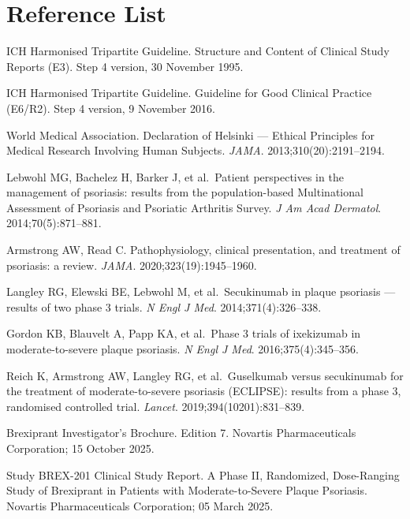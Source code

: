 \documentclass[11pt, a4paper]{article}
\begin{document}
\newpage

\section{Reference List}

\begin{enumerate}[label={[\arabic*]}, leftmargin=*]
  \item ICH Harmonised Tripartite Guideline. Structure and Content of Clinical Study Reports (E3). Step 4 version, 30 November 1995.
  \item ICH Harmonised Tripartite Guideline. Guideline for Good Clinical Practice (E6/R2). Step 4 version, 9 November 2016.
  \item World Medical Association. Declaration of Helsinki --- Ethical Principles for Medical Research Involving Human Subjects. \textit{JAMA}. 2013;310(20):2191--2194.
  \item Lebwohl MG, Bachelez H, Barker J, et al.\ Patient perspectives in the management of psoriasis: results from the population-based Multinational Assessment of Psoriasis and Psoriatic Arthritis Survey. \textit{J Am Acad Dermatol}. 2014;70(5):871--881.
  \item Armstrong AW, Read C. Pathophysiology, clinical presentation, and treatment of psoriasis: a review. \textit{JAMA}. 2020;323(19):1945--1960.
  \item Langley RG, Elewski BE, Lebwohl M, et al.\ Secukinumab in plaque psoriasis --- results of two phase 3 trials. \textit{N Engl J Med}. 2014;371(4):326--338.
  \item Gordon KB, Blauvelt A, Papp KA, et al.\ Phase 3 trials of ixekizumab in moderate-to-severe plaque psoriasis. \textit{N Engl J Med}. 2016;375(4):345--356.
  \item Reich K, Armstrong AW, Langley RG, et al.\ Guselkumab versus secukinumab for the treatment of moderate-to-severe psoriasis (ECLIPSE): results from a phase 3, randomised controlled trial. \textit{Lancet}. 2019;394(10201):831--839.
  \item Brexiprant Investigator's Brochure. Edition 7. Novartis Pharmaceuticals Corporation; 15 October 2025.
  \item Study BREX-201 Clinical Study Report. A Phase II, Randomized, Dose-Ranging Study of Brexiprant in Patients with Moderate-to-Severe Plaque Psoriasis. Novartis Pharmaceuticals Corporation; 05 March 2025.
\end{enumerate}
\end{document}
